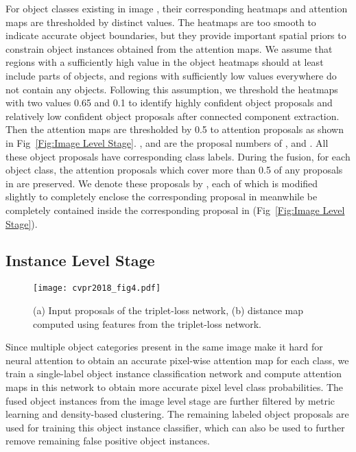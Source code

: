 \documentclass[10pt,twocolumn,letterpaper]{article}
\begin{document}
For object classes existing in image , their corresponding heatmaps  and attention maps  are thresholded by distinct values. The heatmaps  are too smooth to indicate accurate object boundaries, but they provide important spatial priors to constrain object instances obtained from the attention maps. We assume that regions with a sufficiently high value in the object heatmaps should at least include parts of objects, and regions with sufficiently low values everywhere do not contain any objects. Following this assumption, we threshold the heatmaps with two values 0.65 and 0.1 to identify highly confident object proposals  and relatively low confident object proposals  after connected component extraction. Then the attention maps are thresholded by 0.5 to attention proposals  as shown in Fig~\ref{Fig:Image Level Stage}. ,  and  are the proposal numbers of ,  and . All these object proposals have corresponding class labels. During the fusion, for each object class, the attention proposals  which cover more than 0.5 of any proposals in  are preserved. We denote these proposals by , each of which is modified slightly to completely enclose the corresponding proposal in  meanwhile be completely contained inside the corresponding proposal in  (Fig~\ref{Fig:Image Level Stage}).

\subsection{Instance Level Stage}\label{sec:instance}

\begin{figure}
  \centering
  \texttt{[image: cvpr2018\_fig4.pdf]}
  \caption{(a) Input proposals of the triplet-loss network, (b) distance map computed using features from the triplet-loss network.}
  \label{Fig:Instance Level Stage}
\end{figure}

Since multiple object categories present in the same image make it hard for neural attention to obtain an accurate pixel-wise attention map for each class, we train a single-label object instance classification network and compute attention maps in this network to obtain more accurate pixel level class probabilities. The fused object instances from the image level stage are further filtered by metric learning and density-based clustering. The remaining labeled object proposals are used for training this object instance classifier, which can also be used to further remove remaining false positive object instances.
\vspace{-4mm}
\end{document}
